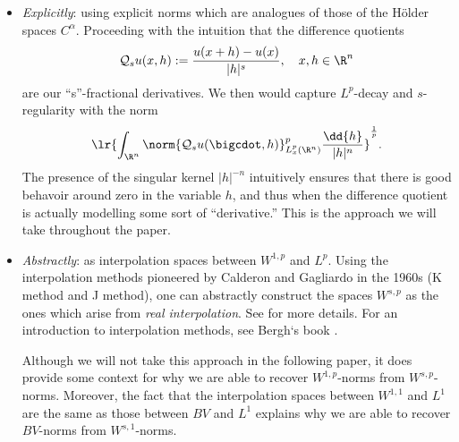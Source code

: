 \documentclass[../main.tex]{subfiles}
\begin{document}
\begin{itemize}
    \item \textit{Explicitly}: using explicit norms which are analogues of those of the H\"older spaces $ C^{\alpha} $. Proceeding with the intuition that the difference quotients 
        \[
            \mathcal{Q}_{s}u(x,h):= \frac{u(x+h)-u(x)}{|h|^{s}},\quad x,h\in \R^{n}
        \]
    are our ``s''-fractional derivatives. We then would capture $ L^{p} $-decay and $ s $-regularity with the norm
    \[
        \lr{\int_{\R^{n}} \norm{\mathcal{Q}_{s}u(\bigcdot,h)}_{L^{p}_{x}(\R^{n})}^{p}\frac{\dd{h}}{|h|^{n}}}^{\frac{1}{p}}.
    \]
    The presence of the singular kernel $ |h|^{-n} $ intuitively ensures that there is good behavoir around zero in the variable $ h $, and thus when the difference quotient is actually modelling some sort of ``derivative.'' This is the approach we will take throughout the paper.\\

    \item \textit{Abstractly}: as interpolation spaces between $ W^{1,p} $ and $ L^{p} $. Using the interpolation methods pioneered by Calderon and Gagliardo in the 1960s (K method and J method), one can abstractly construct the spaces $ W^{s,p} $ as the ones which arise from \textit{real interpolation}. See \cite{ponce:2017} for more details. For an introduction to interpolation methods, see Bergh`s book \cite{bergh:interpolation}.

    Although we will not take this approach in the following paper, it does provide some context for why we are able to recover $ W^{1,p} $-norms from $ W^{s,p} $-norms. Moreover, the fact that the interpolation spaces between $ W^{1,1} $ and $ L^{1} $ are the same as those between $ BV $ and $ L^{1} $ explains why we are able to recover $ BV $-norms from $ W^{s,1} $-norms.
\end{itemize}
\end{document}
